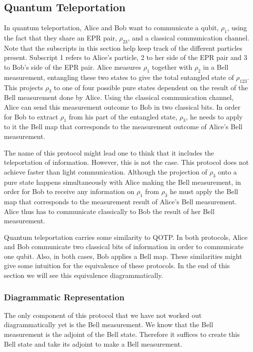 \documentclass[]{article}
\begin{document}
\subsection{Quantum Teleportation}
\label{subsection:QuantumTeleportation}
In quantum teleportation, Alice and Bob want to communicate a qubit, $\rho_1$, using the fact that they share an EPR pair, $\rho_{23}$, and a classical communication channel. Note that the subscripts in this section help keep track of the different particles present. Subscript 1 refers to Alice's particle, 2 to her side of the EPR pair and 3 to Bob's side of the EPR pair. Alice measures $\rho_1$ together with $\rho_{2}$ in a Bell measurement, entangling these two states to give the total entangled state of $\rho_{123}$. This projects $\rho_{3}$ to one of four possible pure states dependent on the result of the Bell measurement done by Alice. Using the classical communication channel, Alice can send this measurement outcome to Bob in two classical bits. In order for Bob to extract  $\rho_1$ from his part of the entangled state, $\rho_{3}$, he needs to apply to it the Bell map that corresponds to the measurement outcome of Alice's Bell measurement.


The name of this protocol might lead one to think that it includes the teleportation of information. However, this is not the case. This protocol does not achieve faster than light communication. Although the projection of $\rho_{3}$ onto a pure state happens simultaneously with Alice making the Bell measurement, in order for Bob to receive any information on $\rho_1$ from $\rho_{3}$ he must apply the Bell map that corresponds to the measurement result of Alice's Bell measurement. Alice thus has to communicate classically to Bob the result of her Bell measurement.

Quantum teleportation carries some similarity to QOTP. In both protocols, Alice and Bob communicate two classical bits of information in order to communicate one qubit. Also, in both cases, Bob applies a Bell map. These similarities might give some intuition for the equivalence of these protocols. In the end of this section we will see this equivalence diagrammatically.

\subsubsection{Diagrammatic Representation}

The only component of this protocol that we have not worked out diagrammatically yet is the Bell measurement. We know that the Bell measurement is the adjoint of the Bell state. Therefore it suffices to create this Bell state and take its adjoint to make a Bell measurement.
\end{document}
